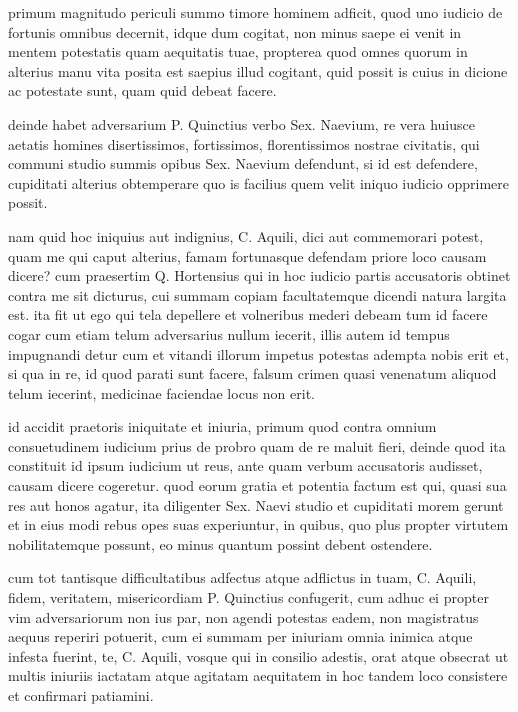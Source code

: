  primum magnitudo periculi summo timore hominem adficit, quod uno iudicio de fortunis omnibus decernit, idque dum cogitat, non minus saepe ei venit in mentem potestatis quam aequitatis tuae, propterea quod omnes quorum in alterius manu vita posita est saepius illud cogitant, quid possit is cuius in dicione ac potestate sunt, quam quid debeat facere.

 deinde habet adversarium P. Quinctius verbo Sex. Naevium, re vera huiusce aetatis homines disertissimos, fortissimos, florentissimos nostrae civitatis, qui communi studio summis opibus Sex. Naevium defendunt, si id est defendere, cupiditati alterius obtemperare quo is facilius quem velit iniquo iudicio opprimere possit.

 nam quid hoc iniquius aut indignius, C. Aquili, dici aut commemorari potest, quam me qui caput alterius, famam fortunasque defendam priore loco causam dicere? cum praesertim Q. Hortensius qui in hoc iudicio partis accusatoris obtinet contra me sit dicturus, cui summam copiam facultatemque dicendi natura largita est. ita fit ut ego qui tela depellere et volneribus mederi debeam tum id facere cogar cum etiam telum adversarius nullum iecerit, illis autem id tempus impugnandi detur cum et vitandi illorum impetus potestas adempta nobis erit et, si qua in re, id quod parati sunt facere, falsum crimen quasi venenatum aliquod telum iecerint, medicinae faciendae locus non erit.

 id accidit praetoris iniquitate et iniuria, primum quod contra omnium consuetudinem iudicium prius de probro quam de re maluit fieri, deinde quod ita constituit id ipsum iudicium ut reus, ante quam verbum accusatoris audisset, causam dicere cogeretur. quod eorum gratia et potentia factum est qui, quasi sua res aut honos agatur, ita diligenter Sex. Naevi studio et cupiditati morem gerunt et in eius modi rebus opes suas experiuntur, in quibus, quo plus propter virtutem nobilitatemque possunt, eo minus quantum possint debent ostendere.

 cum tot tantisque difficultatibus adfectus atque adflictus in tuam, C. Aquili, fidem, veritatem, misericordiam P. Quinctius confugerit, cum adhuc ei propter vim adversariorum non ius par, non agendi potestas eadem, non magistratus aequus reperiri potuerit, cum ei summam per iniuriam omnia inimica atque infesta fuerint, te, C. Aquili, vosque qui in consilio adestis, orat atque obsecrat ut multis iniuriis iactatam atque agitatam aequitatem in hoc tandem loco consistere et confirmari patiamini.

